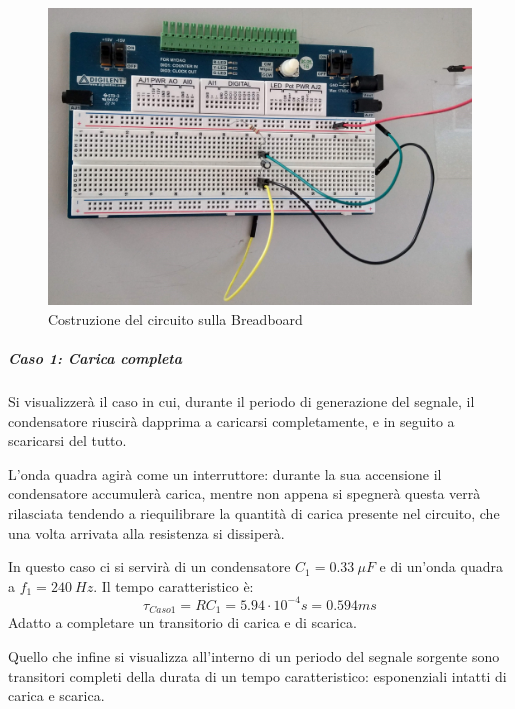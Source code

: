 \documentclass[a4paper, 12pt, twoside]{report}
\begin{document}
{\begin{figure} [H]
	\centering
	\includegraphics[width=1\linewidth]{Esperienza/Breadboard}
	\caption{Costruzione del circuito sulla Breadboard}
	\label{fig:BB}
\end{figure}



 \subparagraph{Caso 1: Carica completa} \mbox{} \newline
 
 Si visualizzerà il caso in cui, durante il periodo di generazione del segnale, il condensatore riuscirà dapprima a caricarsi completamente, e in seguito a scaricarsi del tutto. 
 
 L'onda quadra agirà come un interruttore: durante la sua accensione il condensatore accumulerà carica, mentre non appena si spegnerà questa verrà rilasciata tendendo a riequilibrare la quantità di carica presente nel circuito, che una volta arrivata alla resistenza si dissiperà. 
 
 In questo caso ci si servirà di un condensatore $C_{1}=0.33 ~\mu F$ e di un'onda quadra a $f_{1}=240 ~Hz$.
 Il tempo caratteristico è:
 \[
 \tau_{Caso1}=RC_{1}=5.94\cdot10^{-4}s=0.594ms
 \]
Adatto a completare un transitorio di carica e di scarica.

Quello che infine si visualizza all'interno di un periodo del segnale sorgente sono transitori completi della durata di un tempo caratteristico: esponenziali intatti di carica e scarica.

}
\end{document}

